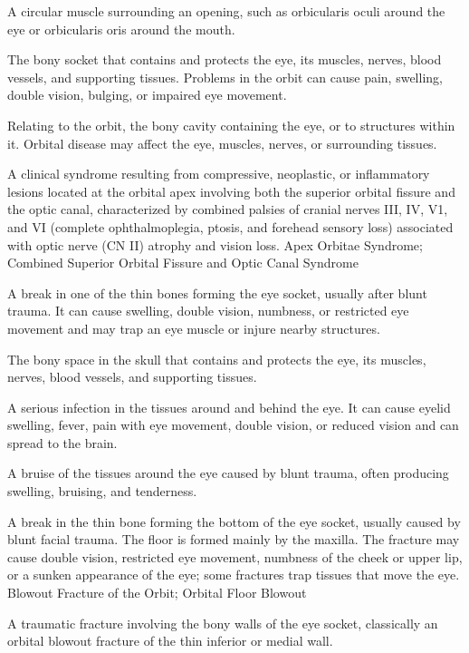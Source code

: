  A circular muscle surrounding an opening, such as orbicularis oculi around the eye or orbicularis oris around the mouth.

 The bony socket that contains and protects the eye, its muscles, nerves, blood vessels, and supporting tissues. Problems in the orbit can cause pain, swelling, double vision, bulging, or impaired eye movement.

 Relating to the orbit, the bony cavity containing the eye, or to structures within it. Orbital disease may affect the eye, muscles, nerves, or surrounding tissues.

 A clinical syndrome resulting from compressive, neoplastic, or inflammatory lesions located at the orbital apex involving both the superior orbital fissure and the optic canal, characterized by combined palsies of cranial nerves III, IV, V1, and VI (complete ophthalmoplegia, ptosis, and forehead sensory loss) associated with optic nerve (CN II) atrophy and vision loss.
\synonyms
Apex Orbitae Syndrome; Combined Superior Orbital Fissure and Optic Canal Syndrome

 A break in one of the thin bones forming the eye socket, usually after blunt trauma. It can cause swelling, double vision, numbness, or restricted eye movement and may trap an eye muscle or injure nearby structures.

 The bony space in the skull that contains and protects the eye, its muscles, nerves, blood vessels, and supporting tissues.

 A serious infection in the tissues around and behind the eye. It can cause eyelid swelling, fever, pain with eye movement, double vision, or reduced vision and can spread to the brain.

 A bruise of the tissues around the eye caused by blunt trauma, often producing swelling, bruising, and tenderness.

 A break in the thin bone forming the bottom of the eye socket, usually caused by blunt facial trauma. The floor is formed mainly by the maxilla. The fracture may cause double vision, restricted eye movement, numbness of the cheek or upper lip, or a sunken appearance of the eye; some fractures trap tissues that move the eye.
\synonyms
Blowout Fracture of the Orbit; Orbital Floor Blowout

 A traumatic fracture involving the bony walls of the eye socket, classically an orbital blowout fracture of the thin inferior or medial wall.


